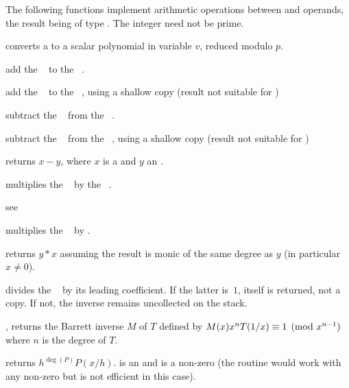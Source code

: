 The following functions implement arithmetic operations between 
and  operands, the result being of type . The integer
 need not be prime.

 converts a  to a scalar
polynomial in variable $v$, reduced modulo $p$.

 add the ~ to the
~.

 add the ~
to the ~, using a shallow copy (result not suitable for
)

 subtract the ~ from
the ~.

 subtract the
~ from the ~, using a shallow copy (result not
suitable for )

 returns $x - y$, where $x$ is
a  and $y$ an .

 multiplies the ~
by the ~.

 see 

 multiplies the ~
by .

 returns $y*x$ assuming the
result is monic of the same degree as $y$ (in particular $x\neq 0$).


 divides the ~ by its
leading coefficient. If the latter is~$1$,  itself is returned, not a
copy. If not, the inverse remains uncollected on the stack.

, returns the Barrett inverse
$M$ of $T$ defined by $M(x)\*x^n\*T(1/x)\equiv 1\pmod{x^{n-1}}$ where $n$ is
the degree of $T$.

 returns $h^{\deg(P)} P(x/h)$.
 is an  and  is a non-zero  (the routine would
work with any non-zero  but is not efficient in this case).

